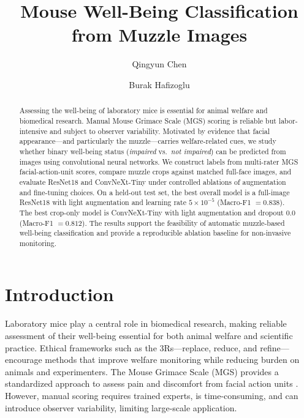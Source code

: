 \documentclass[sigconf]{acmart}
\begin{document}
\title{Mouse Well-Being Classification from Muzzle Images}

\author{Qingyun Chen}
\author{Burak Hafizoglu}

\begin{abstract}
Assessing the well-being of laboratory mice is essential for animal welfare
and biomedical research. Manual Mouse Grimace Scale (MGS) scoring is reliable
but labor-intensive and subject to observer variability. Motivated by evidence
that facial appearance---and particularly the muzzle---carries welfare-related
cues, we study whether binary well-being status
(\textit{impaired} vs.\ \textit{not impaired}) can be predicted from images
using convolutional neural networks. We construct labels from multi-rater MGS
facial-action-unit scores, compare muzzle crops against matched full-face
images, and evaluate ResNet18 and ConvNeXt-Tiny under controlled ablations of
augmentation and fine-tuning choices. On a held-out test set, the best overall
model is a full-image ResNet18 with light augmentation and learning rate
$5\times10^{-5}$ (Macro-F1 $=0.838$). The best crop-only model is ConvNeXt-Tiny
with light augmentation and dropout $0.0$ (Macro-F1 $=0.812$). The results
support the feasibility of automatic muzzle-based well-being classification
and provide a reproducible ablation baseline for non-invasive monitoring.
\end{abstract}

\maketitle

\section{Introduction}
Laboratory mice play a central role in biomedical research, making reliable
assessment of their well-being essential for both animal welfare and
scientific practice. Ethical frameworks such as the 3Rs---replace, reduce, and
refine---encourage methods that improve welfare monitoring while reducing
burden on animals and experimenters. The Mouse Grimace Scale (MGS) provides a
standardized approach to assess pain and discomfort from facial action units
\cite{Langford2010}. However, manual scoring requires trained experts, is
time-consuming, and can introduce observer variability, limiting large-scale
application.
\end{document}
